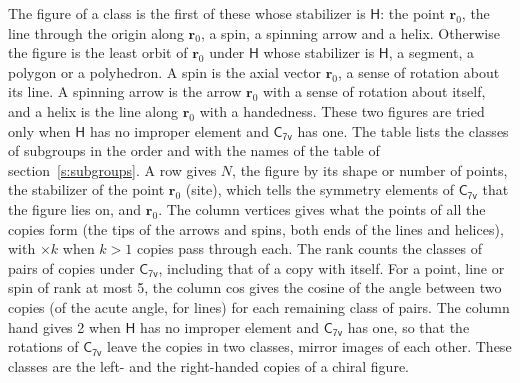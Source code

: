 \documentclass[10pt,a4paper]{article}
\numberwithin{equation}{section}
\newcommand{\grp}[1]{\mathsf{#1}}
\newcommand{\pointr}{\mathbf{r}}
\begin{document}
\leavevmode\label{n:head.figure}The figure of a class is the first of these whose stabilizer is $\grp{H}$: the point $\pointr_0$, the line through the origin along $\pointr_0$, a spin, a spinning arrow and a helix. Otherwise the figure is the least orbit of $\pointr_0$ under $\grp{H}$ whose stabilizer is $\grp{H}$, a segment, a polygon or a polyhedron. A spin is the axial vector $\pointr_0$, a sense of rotation about its line. A spinning arrow is the arrow $\pointr_0$ with a sense of rotation about itself, and a helix is the line along $\pointr_0$ with a handedness. These two figures are tried only when $\grp{H}$ has no improper element and $\grp{C_{7v}}$ has one. The table lists the classes of subgroups in the order and with the names of the table of section~\ref{s:subgroups}. \label{n:head.site}A row gives $N$, the figure by its shape or number of points, the stabilizer of the point $\pointr_0$ (site), which tells the symmetry elements of $\grp{C_{7v}}$ that the figure lies on, and $\pointr_0$. \label{n:head.vertices}The column vertices gives what the points of all the copies form (the tips of the arrows and spins, both ends of the lines and helices), with ${\times}k$ when $k > 1$ copies pass through each. \label{n:head.rank}The rank counts the classes of pairs of copies under $\grp{C_{7v}}$, including that of a copy with itself. \label{n:head.cos}For a point, line or spin of rank at most 5, the column cos gives the cosine of the angle between two copies (of the acute angle, for lines) for each remaining class of pairs. \label{n:head.hand}The column hand gives 2 when $\grp{H}$ has no improper element and $\grp{C_{7v}}$ has one, so that the rotations of $\grp{C_{7v}}$ leave the copies in two classes, mirror images of each other. These classes are the left- and the right-handed copies of a chiral figure.
\end{document}
